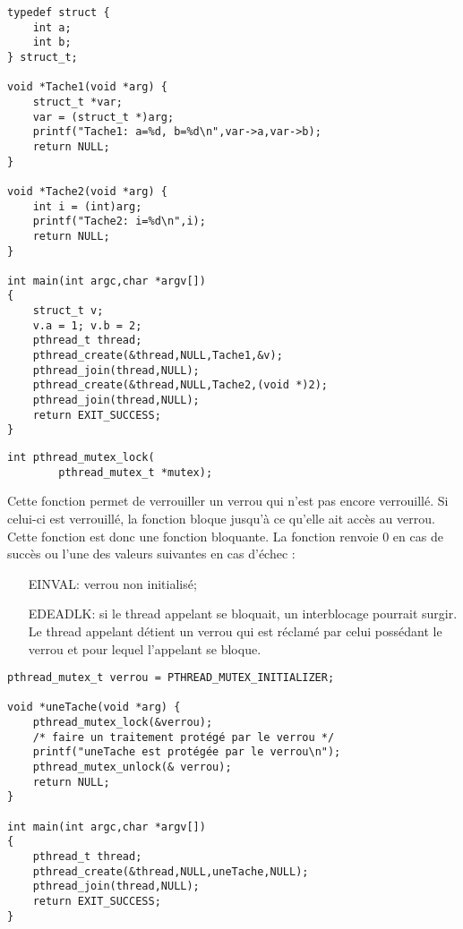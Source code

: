 \begin{lstlisting}
typedef struct {
	int a;
	int b;
} struct_t;

void *Tache1(void *arg) {
	struct_t *var;
	var = (struct_t *)arg;
	printf("Tache1: a=%d, b=%d\n",var->a,var->b);
	return NULL;
}

void *Tache2(void *arg) {
	int i = (int)arg;
	printf("Tache2: i=%d\n",i);
	return NULL;
}

int main(int argc,char *argv[])
{
	struct_t v;
	v.a = 1; v.b = 2;
	pthread_t thread;
	pthread_create(&thread,NULL,Tache1,&v);
	pthread_join(thread,NULL);
	pthread_create(&thread,NULL,Tache2,(void *)2);
	pthread_join(thread,NULL);
	return EXIT_SUCCESS;
}
\end{lstlisting}




\label{func:pthread_mutex_lock}

\begin{lstlisting}
int pthread_mutex_lock(
		pthread_mutex_t *mutex);
\end{lstlisting}

Cette fonction permet de verrouiller un verrou qui n'est pas encore verrouillé. Si celui-ci est verrouillé, la fonction bloque jusqu'à ce qu'elle ait accès au verrou. Cette fonction est donc une fonction bloquante. La fonction renvoie 0 en cas de succès ou l'une des valeurs suivantes en cas d'échec :
\begin{itemize}
\item[EINVAL:] verrou non initialisé;
\item[EDEADLK:] si le thread appelant se bloquait, un interblocage pourrait surgir. Le thread appelant détient un verrou qui est réclamé par celui possédant le verrou et pour lequel l'appelant se bloque.
\end{itemize}

\begin{lstlisting}
pthread_mutex_t verrou = PTHREAD_MUTEX_INITIALIZER;

void *uneTache(void *arg) {
	pthread_mutex_lock(&verrou);
	/* faire un traitement protégé par le verrou */
	printf("uneTache est protégée par le verrou\n");
	pthread_mutex_unlock(& verrou);
	return NULL;
}

int main(int argc,char *argv[])
{
	pthread_t thread;
	pthread_create(&thread,NULL,uneTache,NULL);
	pthread_join(thread,NULL);
	return EXIT_SUCCESS;
}
\end{lstlisting}



